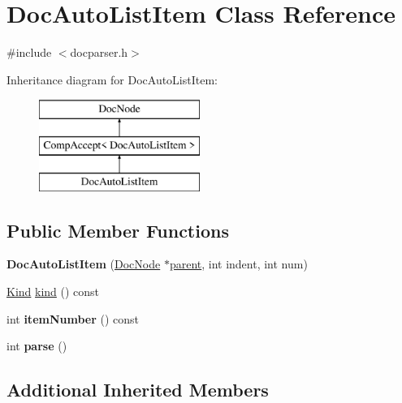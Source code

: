 \hypertarget{class_doc_auto_list_item}{}\section{Doc\+Auto\+List\+Item Class Reference}
\label{class_doc_auto_list_item}


{\ttfamily \#include $<$docparser.\+h$>$}

Inheritance diagram for Doc\+Auto\+List\+Item\+:\begin{figure}[H]
\begin{center}
\leavevmode
\includegraphics[height=3.000000cm]{class_doc_auto_list_item}
\end{center}
\end{figure}
\subsection*{Public Member Functions}
\begin{DoxyCompactItemize}
\item 
\mbox{\label{class_doc_auto_list_item_a2b29a9aa6b46c4c2c95f361bd3e14112}} 
{\bfseries Doc\+Auto\+List\+Item} (\mbox{\hyperlink{class_doc_node}{Doc\+Node}} $\ast$\mbox{\hyperlink{class_doc_node_a73e8ad29a91cfceb0968eb00db71a23d}{parent}}, int indent, int num)
\item 
\mbox{\hyperlink{class_doc_node_aebd16e89ca590d84cbd40543ea5faadb}{Kind}} \mbox{\hyperlink{class_doc_auto_list_item_a4a405f6baad7d2ddb30df82ab73d7ab5}{kind}} () const
\item 
\mbox{\label{class_doc_auto_list_item_a2d307e9d399d0209c30a717f07d81ee2}} 
int {\bfseries item\+Number} () const
\item 
\mbox{\label{class_doc_auto_list_item_abb513e12cef0ab6a17ac78a795d4cedb}} 
int {\bfseries parse} ()
\end{DoxyCompactItemize}
\subsection*{Additional Inherited Members}


